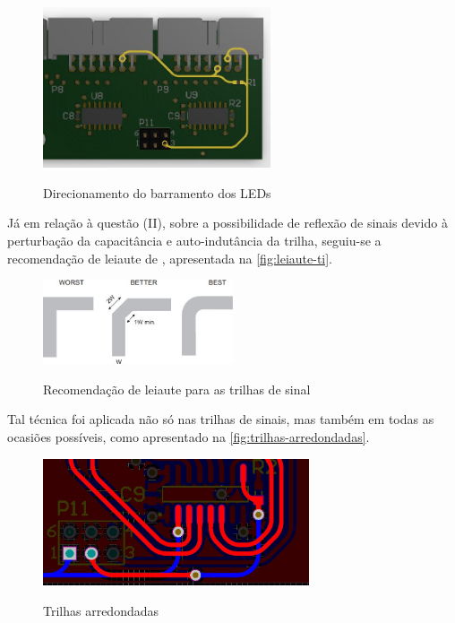 \begin{figure}[H]
    \centering
    \caption{Direcionamento do barramento dos LEDs}
    \includegraphics[width=0.6\textwidth]{./dados/figuras/dir-leds}
    \label{fig:direcionamento-leds}
\end{figure}

Já em relação à questão (II), sobre a possibilidade de reflexão de sinais devido à perturbação da capacitância e auto-indutância da trilha, seguiu-se a recomendação de leiaute de \cite{datasheet-ti}, apresentada na \autoref{fig:leiaute-ti}.

\begin{figure}[H]
    \centering
    \caption{Recomendação de leiaute para as trilhas de sinal}
    \includegraphics[width=0.5\textwidth]{./dados/figuras/leiaute-ti}
    \label{fig:leiaute-ti}
\end{figure}

Tal técnica foi aplicada não só nas trilhas de sinais, mas também em todas as ocasiões possíveis, como apresentado na \autoref{fig:trilhas-arredondadas}.

\begin{figure}[H]
    \centering
    \caption{Trilhas arredondadas}
    \includegraphics[width=0.7\textwidth]{./dados/figuras/trilhas-arredondadas}
    \label{fig:trilhas-arredondadas}
\end{figure}

